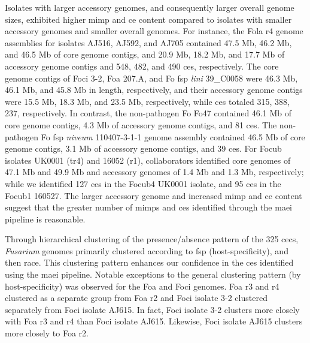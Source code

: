 Isolates with larger accessory genomes, and consequently larger overall genome sizes, exhibited higher \ac{mimp} and \ac{ce} content compared to isolates with smaller accessory genomes and smaller overall genomes. For instance, the \ac{Fola} \ac{r4} genome assemblies for isolates AJ516, AJ592, and AJ705 contained 47.5 Mb, 46.2 Mb, and 46.5 Mb of core genome contigs, and 20.9 Mb, 18.2 Mb, and 17.7 Mb of accessory genome contigs and 548, 482, and 490 \acp{ce}, respectively. The core genome contigs of \ac{Foci} 3-2, \ac{Foa} 207.A, and \ac{Fo} \ac{fsp} \textit{lini} 39\_C0058 were 46.3 Mb, 46.1 Mb, and 45.8 Mb in length, respectively, and their accessory genome contigs were 15.5 Mb, 18.3 Mb, and 23.5 Mb, respectively, while \acp{ce} totaled 315, 388, 237, respectively. In contrast, the non-pathogen \ac{Fo} Fo47 contained 46.1 Mb of core genome contigs, 4.3 Mb of accessory genome contigs, and 81 \acp{ce}. The non-pathogen \ac{Fo} \ac{fsp} \textit{niveum} 110407-3-1-1 genome assembly contained 46.5 Mb of core genome contigs, 3.1 Mb of accessory genome contigs, and 39 \acp{ce}. For \ac{Focub} isolates UK0001 (\ac{tr4}) and 16052 (\ac{r1}), collaborators identified core genomes of 47.1 Mb and 49.9 Mb and accessory genomes of 1.4 Mb and 1.3 Mb, respectively; while we identified 127 \acp{ce} in the \ac{Focub4} UK0001 isolate, and 95 \acp{ce} in the \ac{Focub1} 160527. The larger accessory genome and increased \ac{mimp} and \ac{ce} content suggest that the greater number of \acp{mimp} and \acp{ce} identified through the \ac{maei} pipeline is reasonable.

Through hierarchical clustering of the presence/absence pattern of the 325 \acp{cec}, \textit{Fusarium} genomes primarily clustered according to \ac{fsp} (host-specificity), and then race. This clustering pattern enhances our confidence in the \acp{ce} identified using the \ac{maei} pipeline. Notable exceptions to the general clustering pattern (by host-specificity) was observed for the \ac{Foa} and \ac{Foci} genomes. \ac{Foa} \ac{r3} and \ac{r4} clustered as a separate group from \ac{Foa} \ac{r2} and \ac{Foci} isolate 3-2 clustered separately from \ac{Foci} isolate AJ615. In fact, \ac{Foci} isolate 3-2 clusters more closely with \ac{Foa} \ac{r3} and \ac{r4} than \ac{Foci} isolate AJ615. Likewise, \ac{Foci} isolate AJ615 clusters more closely to \ac{Foa} \ac{r2}. 

